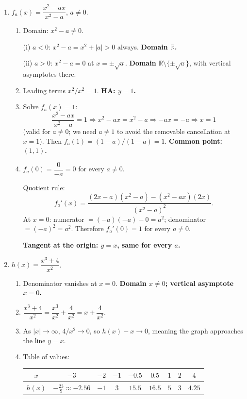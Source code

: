 \documentclass[12pt, twoside]{article}
\begin{document}
\begin{enumerate}[itemsep=0.3cm]
\medskip

\item $\displaystyle f_a(x)=\dfrac{x^2-ax}{x^2-a}$, $a\ne 0$.

\begin{enumerate}[label=(\alph*), itemsep=0.2cm]
  \item Domain: $x^2-a\ne 0$.

  \quad (i) $a<0$: $x^2-a=x^2+|a|>0$ always. \textbf{Domain $\mathbb{R}$.}

  \quad (ii) $a>0$: $x^2-a=0$ at $x=\pm\sqrt a$. \textbf{Domain
  $\mathbb{R}\setminus\{\pm\sqrt a\}$}, with vertical asymptotes there.

  \item Leading terms $x^2/x^2=1$. \textbf{HA: $y=1$.}

  \item Solve $f_a(x)=1$:
  \[
  \dfrac{x^2-ax}{x^2-a}=1\Rightarrow x^2-ax=x^2-a\Rightarrow -ax=-a\Rightarrow x=1
  \]
  (valid for $a\ne 0$; we need $a\ne 1$ to avoid the removable cancellation at
  $x=1$). Then $f_a(1)=(1-a)/(1-a)=1$. \textbf{Common point: $(1,1)$.}
\newpage
  \item $f_a(0)=\dfrac{0}{-a}=0$ for every $a\ne 0$.

  Quotient rule:
  \[
  f_a'(x)=\dfrac{(2x-a)(x^2-a)-(x^2-ax)(2x)}{(x^2-a)^2}.
  \]
  At $x=0$: numerator $=(-a)(-a)-0=a^2$; denominator $=(-a)^2=a^2$.
  Therefore $f_a'(0)=1$ for every $a\ne 0$.

  \textbf{Tangent at the origin: $y=x$, same for every $a$.}
\end{enumerate}

\medskip

\item $\displaystyle h(x)=\dfrac{x^3+4}{x^2}$.

\begin{enumerate}[label=(\alph*), itemsep=0.2cm]
  \item Denominator vanishes at $x=0$. \textbf{Domain $x\ne 0$; vertical
  asymptote $x=0$.}

  \item $\dfrac{x^3+4}{x^2}=\dfrac{x^3}{x^2}+\dfrac{4}{x^2}=x+\dfrac{4}{x^2}$.

  \item As $|x|\to\infty$, $4/x^2\to 0$, so $h(x)-x\to 0$, meaning the graph
  approaches the line $y=x$.

  \item Table of values:
  \begin{center}
  \begin{tabular}{|c|c|c|c|c|c|c|c|c|}
  \hline
  $x$    & $-3$ & $-2$ & $-1$ & $-0.5$ & $0.5$ & $1$ & $2$ & $4$ \\
  \hline
  $h(x)$ & $-\tfrac{23}{9}\approx-2.56$ & $-1$ & $3$ & $15.5$ & $16.5$ & $5$ & $3$ & $4.25$ \\
  \hline
  \end{tabular}
  \end{center}


\end{enumerate}
\end{enumerate}
\end{document}
